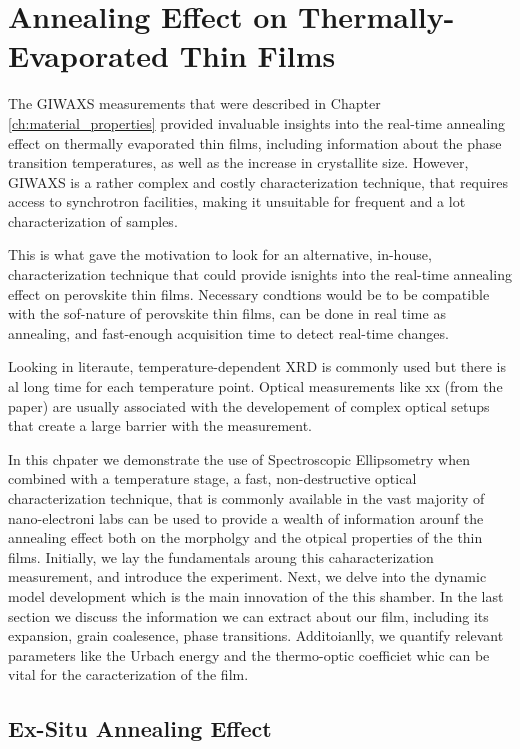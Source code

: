 \chapter{Annealing Effect on Thermally-Evaporated  Thin Films}\label{ch:ellipsometry}


The GIWAXS measurements that were described in Chapter \ref{ch:material_properties} provided invaluable insights into the real-time annealing effect on thermally evaporated  thin films, including information about the phase transition temperatures, as well as the increase in crystallite size. However, GIWAXS is a rather complex and costly characterization technique, that requires access to synchrotron facilities, making it unsuitable for frequent and a lot characterization of samples. 

This is what gave the motivation to look for an alternative, in-house, characterization technique that could provide isnights into the real-time annealing effect on perovskite thin films. Necessary condtions would be to be compatible with the sof-nature of perovskite thin films, can be done in real time as annealing, and fast-enough acquisition time to detect real-time changes. 

Looking in literaute, temperature-dependent XRD is commonly used but there is al long time for each temperature point. Optical measurements like xx (from the paper) are usually associated with the developement of complex optical setups that create a large barrier with the measurement. 

In this chpater we demonstrate the use of Spectroscopic Ellipsometry when combined with a temperature stage, a fast, non-destructive optical characterization technique, that is commonly available in the vast majority of nano-electroni labs can be used to provide a wealth of information arounf the annealing effect both on the morpholgy and the otpical properties of the thin films. 
Initially, we lay the fundamentals aroung this caharacterization measurement, and introduce the experiment. Next, we delve into the dynamic model development which is the main innovation of the this shamber. In the last section we discuss the information we can extract about our film, including its expansion, grain coalesence, phase transitions. Additoianlly, we quantify relevant parameters like the Urbach energy and the thermo-optic coefficiet whic can be vital for the caracterization of the film. 

\section{Ex-Situ Annealing Effect}


